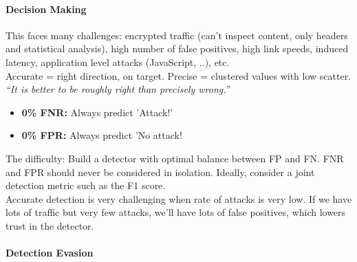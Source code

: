 \paragraph{Decision Making}

This faces many challenges: encrypted traffic (can't inspect content, only headers and statistical analysis), high number of false positives, high link speeds, induced latency, application level attacks (JavaScript, ..), etc.
\\
Accurate = right direction, on target. Precise = clustered values with low scatter.\\

\textit{“It is better to be roughly right than precisely wrong.”}\\

\begin{itemize}
	\item \textbf{0\% FNR:} Always predict 'Attack!'
	\item \textbf{0\% FPR:} Always predict 'No attack!
\end{itemize}

The difficulty: Build a detector with optimal balance between FP and FN. FNR and FPR should never be considered in isolation. Ideally, consider a joint detection metric such as the F1 score.\\
Accurate detection is very challenging when rate of attacks is very low. If we have lots of traffic but very few attacks, we'll have lots of false positives, which lowers trust in the detector. 

\paragraph{Detection Evasion}

